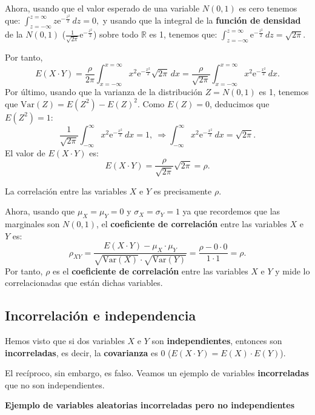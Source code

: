 \documentclass[]{book}
\begin{document}
Ahora, usando que el valor esperado de una variable \(N(0,1)\) es cero tenemos que:
\(\int_{z=-\infty}^{z=\infty} z \mathrm{e}^{-\frac{z^2}{2}}\, dz =0,\) y usando que la integral de la \textbf{función de densidad} de la \(N(0,1)\) (\(\frac{1}{\sqrt{2\pi}}\mathrm{e}^{-\frac{z^2}{2}}\)) sobre todo \(\mathbb{R}\) es 1, tenemos que:
\(\int_{z=-\infty}^{z=\infty} \mathrm{e}^{-\frac{z^2}{2}}\, dz =\sqrt{2\pi}.\)

Por tanto,
\[
E(X\cdot Y)=\frac{\rho}{2\pi} \int_{x=-\infty}^{x=\infty} x^2  \mathrm{e}^{-\frac{x^2}{2}}\sqrt{2\pi}\, dx=\frac{\rho}{\sqrt{2\pi}}\int_{x=-\infty}^{x=\infty} x^2  \mathrm{e}^{-\frac{x^2}{2}}\, dx.
\]
Por último, usando que la varianza de la distribución \(Z=N(0,1)\) es 1, tenemos que \(\mathrm{Var}(Z)=E\left(Z^2\right)-E(Z)^2\). Como \(E(Z)=0\), deducimos que \(E\left(Z^2\right)=1\):
\[
\frac{1}{\sqrt{2\pi}}\int_{-\infty}^\infty x^2\mathrm{e}^{-\frac{x^2}{2}}\, dx=1,\ \Rightarrow \int_{-\infty}^\infty x^2\mathrm{e}^{-\frac{x^2}{2}}\, dx=\sqrt{2\pi}.
\]
El valor de \(E(X\cdot Y)\) es:
\[
E(X\cdot Y)=\frac{\rho}{\sqrt{2\pi}}\sqrt{2\pi}=\rho.
\]

La correlación entre las variables \(X\) e \(Y\) es precisamente \(\rho\).

Ahora, usando que \(\mu_X=\mu_Y=0\) y \(\sigma_X=\sigma_Y=1\) ya que recordemos que las marginales son \(N(0,1)\), el \textbf{coeficiente de correlación} entre las variables \(X\) e \(Y\) es:
\[
\rho_{XY}=\frac{E(X\cdot Y)-\mu_X\cdot \mu_Y}{\sqrt{\mathrm{Var}(X)}\cdot\sqrt{\mathrm{Var}(Y)}}=\frac{\rho-0\cdot 0}{1\cdot 1}=\rho.
\]
Por tanto, \(\rho\) es el \textbf{coeficiente de correlación} entre las variables \(X\) e \(Y\) y mide lo correlacionadas que están dichas variables.

\hypertarget{incorrelaciuxf3n-e-independencia}{%
\subsection{Incorrelación e independencia}\label{incorrelaciuxf3n-e-independencia}}

Hemos visto que si dos variables \(X\) e \(Y\) son \textbf{independientes}, entonces son \textbf{incorreladas}, es decir, la \textbf{covarianza} es 0 (\(E(X\cdot Y)=E(X)\cdot E(Y)\)).

El recíproco, sin embargo, es falso. Veamos un ejemplo de variables \textbf{incorreladas} que no son independientes.

\textbf{Ejemplo de variables aleatorias incorreladas pero no independientes}
\end{document}
